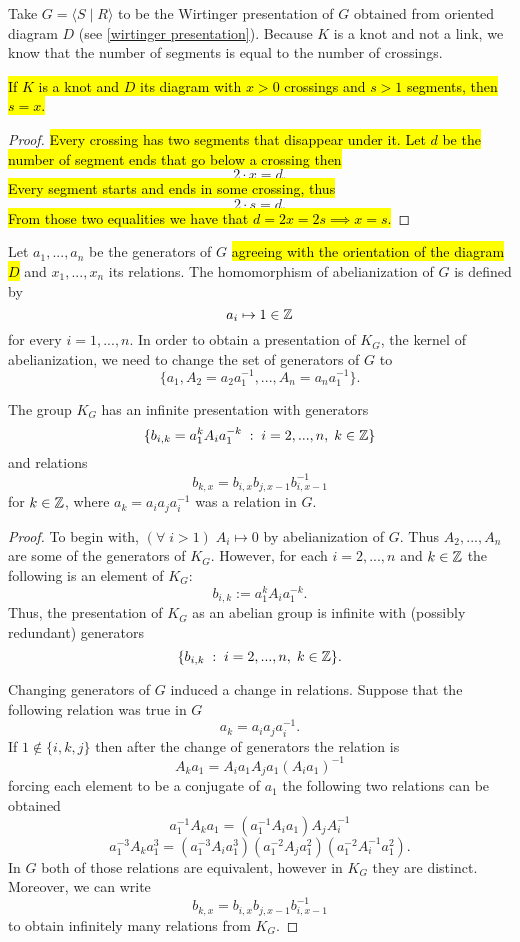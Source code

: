 Take $G=\langle S\;|\;R\rangle$ to be the Wirtinger presentation of $G$ obtained from oriented diagram $D$ (see \cref{wirtinger presentation}). Because $K$ is a knot and not a link, we know that the number of segments is equal to the number of crossings.

\begin{lemma}\label{ilosc segmentow to ilosc skrzyzowan}\hl{
  If $K$ is a knot and $D$ its diagram with $x>0$ crossings and $s>1$ segments, then $s=x$.}
\end{lemma}

\begin{proof}\hl{
  Every crossing has two segments that disappear under it. Let $d$ be the number of segment ends that go below a crossing then}
  $$2\cdot x=d.$$ \hl{
  Every segment starts and ends in some crossing, thus}
  $$2\cdot s=d.$$\hl{
  From those two equalities we have that $d=2x=2s\implies x=s$.}
\end{proof}

Let $a_1,...,a_n$ be the generators of $G$ \hl{agreeing with the orientation of the diagram $D$} and $x_1,...,x_n$ its relations. The homomorphism of abelianization of $G$ is defined by 
$$a_i\mapsto 1\in\operatorname{\mathbb{Z}}$$ 
for every $i=1,...,n$. 
In order to obtain a presentation of $K_G$, the kernel of abelianization, we need to change the set of generators of $G$ to 
$$\{a_1, A_2=a_2a_1^{-1},..., A_n=a_na_1^{-1}\}.$$

\begin{proposition}[presentation of $K_G$]\label{presentation of KG}
  The group $K_G$ has an infinite presentation with generators
  $$\{b_{i,k}=a_1^kA_ia_1^{-k}\;:\;i=2,...,n,\;k\in\operatorname{\mathbb{Z}}\}$$
  and relations 
$$
b_{k, x}=b_{i, x}b_{j, x-1}b_{i, x-1}^{-1}
$$
for $k\in\operatorname{\mathbb{Z}}$, where $a_k=a_ia_ja_i^{-1}$ was a relation in $G$.
\end{proposition}

\begin{proof}
To begin with, $(\forall\;i>1)\;A_i\mapsto0$ by abelianization of $G$. Thus $A_2,...,A_n$ are some of the generators of $K_G$. However, for each $i=2,...,n$ and $k\in\operatorname{\mathbb{Z}}$ the following is an element of $K_G$:
$$b_{i, k}:=a_1^k A_i a_1^{-k}.$$
Thus, the presentation of $K_G$ as an abelian group is infinite with (possibly redundant) generators 
$$\{b_{i,k}\;:\;i=2,...,n,\;k\in\operatorname{\mathbb{Z}}\}.$$

Changing generators of $G$ induced a change in relations. Suppose that the following relation was true in $G$
$$a_k=a_ia_ja_i^{-1}.$$
If $1\notin\{i,k,j\}$ then after the change of generators the relation is
$$ A_ka_1 = A_ia_1 A_ja_1 (A_ia_1)^{-1}
$$
forcing each element to be a conjugate of $a_1$ the following two relations can be obtained
$$ a_1^{-1}A_ka_1=(a_1^{-1} A_i a_1)A_jA_i^{-1}
$$
$$
a_1^{-3} A_k a_1^3 = (a_1^{-3} A_i a_1^3) (a_1^{-2} A_j a_1^2) (a_1^{-2} A_i^{-1} a_1^2).
$$
In $G$ both of those relations are equivalent, however in $K_G$ they are distinct. Moreover, we can write 
$$
b_{k, x}=b_{i, x}b_{j, x-1}b_{i, x-1}^{-1}
$$
to obtain infinitely many relations from $K_G$.
\end{proof}

